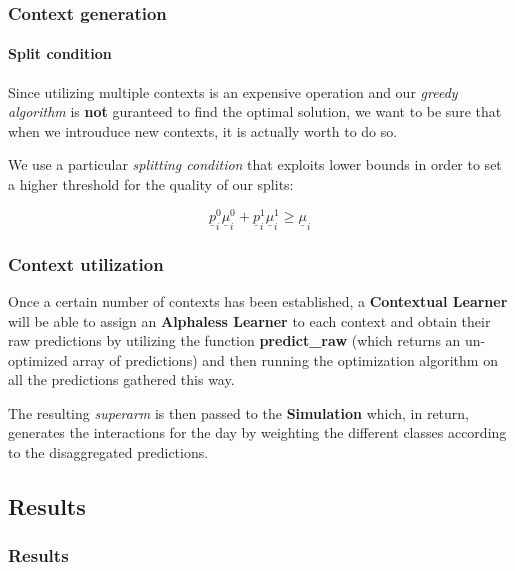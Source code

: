 
\begin{frame}

\frametitle{Context generation}
\framesubtitle{Split condition}

Since utilizing multiple contexts is an expensive operation and our \textit{greedy algorithm} is \textbf{not} guranteed to find the optimal solution, we want to be sure that when we introuduce new contexts, it is actually worth to do so.

We use a particular \textit{splitting condition} that exploits lower bounds in order to set a higher threshold for the quality of our splits:

\begin{Large}
    \begin{displaymath}
        \underline{p}_i^0 \underline{\mu}_i^0 + \underline{p}_i^1 \underline{\mu}_i^1 \geq \underline{\mu}_i
    \end{displaymath}
\end{Large}

\end{frame}


\begin{frame}

\frametitle{Context utilization}

Once a certain number of contexts has been established, a \textbf{Contextual Learner} will be able to assign an \textbf{Alphaless Learner} to each context and obtain their raw predictions by utilizing the function \textbf{predict\_raw} (which returns an un-optimized array of predictions) and then running the optimization algorithm on all the predictions gathered this way.

The resulting \textit{superarm} is then passed to the \textbf{Simulation} which, in return, generates the interactions for the day by weighting the different classes according to the disaggregated predictions.

\end{frame}


\subsection{Results}


\begin{frame}

\frametitle{Results}
\framesubtitle{}


\end{frame}

